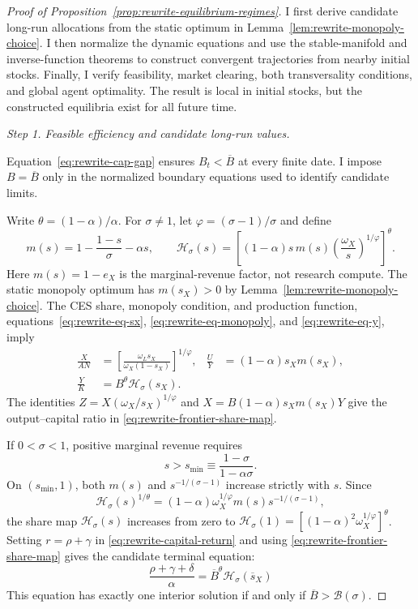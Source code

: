 \label{app:rewrite-finite-existence}
\label{proof:rewrite-equilibrium-regimes}
\begin{proof}[Proof of Proposition~\ref{prop:rewrite-equilibrium-regimes}]

I first derive candidate long-run allocations from the static optimum in
Lemma~\ref{lem:rewrite-monopoly-choice}. I then normalize the dynamic
equations and use the stable-manifold and inverse-function theorems to
construct convergent trajectories from nearby initial stocks. Finally,
I verify feasibility, market clearing, both transversality conditions, and
global agent optimality. The result is local in initial stocks, but the
constructed equilibria exist for all future time.

\par\medskip\noindent\textit{Step 1. Feasible efficiency and candidate long-run values.}

Equation~\eqref{eq:rewrite-cap-gap} ensures $B_t<\overline B$ at every
finite date. I impose $B=\overline B$ only in the normalized boundary
equations used to identify candidate limits.


Write $\theta=(1-\alpha)/\alpha$. For $\sigma\ne1$, let
$\varphi=(\sigma-1)/\sigma$ and define
\[
 m(s)=1-\frac{1-s}{\sigma}-\alpha s,\qquad
 \mathcal H_\sigma(s)=
 \left[(1-\alpha)s\,m(s)
       \left(\frac{\omega_X}{s}\right)^{1/\varphi}\right]^\theta.
\]
Here $m(s)=1-e_X$ is the marginal-revenue factor, not research compute.
The static monopoly optimum has $m(s_X)>0$ by
Lemma~\ref{lem:rewrite-monopoly-choice}. The CES share, monopoly condition,
and production function, equations~\eqref{eq:rewrite-eq-sx},
\eqref{eq:rewrite-eq-monopoly}, and \eqref{eq:rewrite-eq-y}, imply
\begin{align}
 \frac{X}{AN}
 &=\left[\frac{\omega_Ls_X}{\omega_X(1-s_X)}\right]^{1/\varphi},
 &
 \frac{U}{Y}&=(1-\alpha)s_Xm(s_X), \label{eq:rewrite-frontier-static-shares}\\
 \frac{Y}{K}&=B^\theta\mathcal H_\sigma(s_X).
 \label{eq:rewrite-frontier-share-map}
\end{align}
The identities $Z=X(\omega_X/s_X)^{1/\varphi}$ and
$X=B(1-\alpha)s_Xm(s_X)Y$ give the output--capital ratio in
\eqref{eq:rewrite-frontier-share-map}.

If $0<\sigma<1$, positive marginal revenue requires
\[
 s>s_{\min}\equiv\frac{1-\sigma}{1-\alpha\sigma}.
\]
On $(s_{\min},1)$, both $m(s)$ and $s^{-1/(\sigma-1)}$ increase strictly with $s$.
Since
\[
 \mathcal H_\sigma(s)^{1/\theta}
 =(1-\alpha)\omega_X^{1/\varphi}
 m(s)s^{-1/(\sigma-1)},
\]
the share map $\mathcal H_\sigma(s)$ increases from zero to
$\mathcal H_\sigma(1)=[(1-\alpha)^2\omega_X^{1/\varphi}]^\theta$.
Setting $r=\rho+\gamma$ in \eqref{eq:rewrite-capital-return} and using
\eqref{eq:rewrite-frontier-share-map} gives the candidate terminal equation:
\begin{equation}
 \frac{\rho+\gamma+\delta}{\alpha}
 =\overline B^\theta\mathcal H_\sigma(\overline s_X)
 \label{eq:rewrite-terminal-share-root}
\end{equation}
This equation has exactly one interior solution if and only if
$\overline B>\mathcal B(\sigma)$.


\end{proof}
